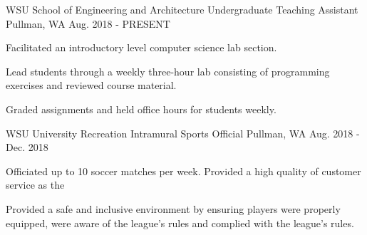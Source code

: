 \begin{cventries}
  \cventry
    {WSU School of Engineering and Architecture}
    {Undergraduate Teaching Assistant}
    {Pullman, WA}
    {Aug. 2018 - PRESENT}
    {
      \begin{cvitems}
        \item {Facilitated an introductory level computer science lab section.}
        \item{Lead students through a weekly three-hour lab consisting of programming exercises and reviewed course material.}
        \item {Graded assignments and held office hours for students weekly.}
      \end{cvitems}
    }
  \cventry
    {WSU University Recreation}
    {Intramural Sports Official}
    {Pullman, WA}
    {Aug. 2018 - Dec. 2018}
    {
      \begin{cvitems}
        \item {Officiated up to 10 soccer matches per week. Provided a high quality of customer service as the }
        \item {Provided a safe and inclusive environment by ensuring players were properly equipped, were aware of the league's rules and complied with the league's rules.}
      \end{cvitems}
    }
    
\end{cventries}